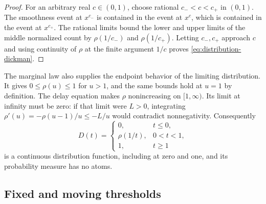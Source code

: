 \begin{proof}
For an arbitrary real $c\in(0,1)$, choose rational
$c_-<c<c_+$ in $(0,1)$.  The smoothness event at $x^{c_-}$ is
contained in the event at $x^c$, which is contained in the event at
$x^{c_+}$.  The rational limits bound the lower and upper limits
of the middle normalized count by $\rho(1/c_-)$ and $\rho(1/c_+)$.
Letting $c_-,c_+$ approach $c$ and using continuity of $\rho$ at
the finite argument $1/c$ proves \eqref{eq:distribution-dickman}.
\end{proof}

The marginal law also supplies the endpoint behavior of the limiting
distribution.  It gives $0\le\rho(u)\le1$ for $u>1$, and the same
bounds hold at $u=1$ by definition.  The delay equation makes $\rho$
nonincreasing on $[1,\infty)$.  Its limit at infinity must be zero:
if that limit were $L>0$, integrating
$\rho'(u)=-\rho(u-1)/u\le-L/u$ would contradict nonnegativity.
Consequently
\begin{equation}
 D(t)=
 \begin{cases}
  0,&t\le0,\\
  \rho(1/t),&0<t<1,\\
  1,&t\ge1
 \end{cases}
 \label{eq:distribution-D}
\end{equation}
is a continuous distribution function, including at zero and one,
and its probability measure has no atoms.

\subsection{Fixed and moving thresholds}

